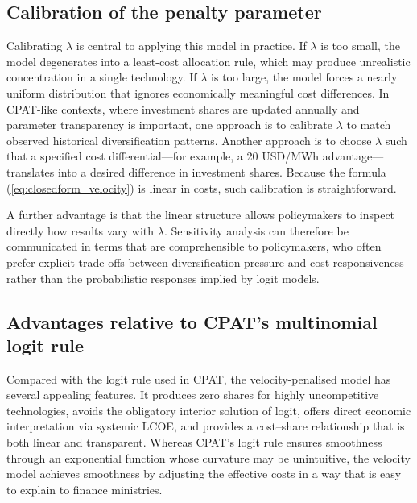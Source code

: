 \documentclass[preprint,authoryear,12pt]{elsarticle}
\begin{document}
\subsection{Calibration of the penalty parameter}

Calibrating $\lambda$ is central to applying this model in practice. If $\lambda$ is too small, the
model degenerates into a least-cost allocation rule, which may produce unrealistic concentration
in a single technology. If $\lambda$ is too large, the model forces a nearly uniform distribution
that ignores economically meaningful cost differences. In CPAT-like contexts, where investment
shares are updated annually and parameter transparency is important, one approach is to
calibrate $\lambda$ to match observed historical diversification patterns. Another approach is to
choose $\lambda$ such that a specified cost differential—for example, a 20 USD/MWh advantage—
translates into a desired difference in investment shares. Because the formula
(\ref{eq:closedform_velocity}) is linear in costs, such calibration is straightforward.

A further advantage is that the linear structure allows policymakers to inspect directly how
results vary with $\lambda$. Sensitivity analysis can therefore be communicated in terms that are
comprehensible to policymakers, who often prefer explicit trade-offs between diversification
pressure and cost responsiveness rather than the probabilistic responses implied by logit models.

\subsection{Advantages relative to CPAT’s multinomial logit rule}

Compared with the logit rule used in CPAT, the velocity-penalised model has several appealing
features. It produces zero shares for highly uncompetitive technologies, avoids the obligatory
interior solution of logit, offers direct economic interpretation via systemic LCOE, and provides
a cost–share relationship that is both linear and transparent. Whereas CPAT’s logit rule ensures
smoothness through an exponential function whose curvature may be unintuitive, the
velocity model achieves smoothness by adjusting the effective costs in a way that is easy to
explain to finance ministries.

\newpage
\end{document}
